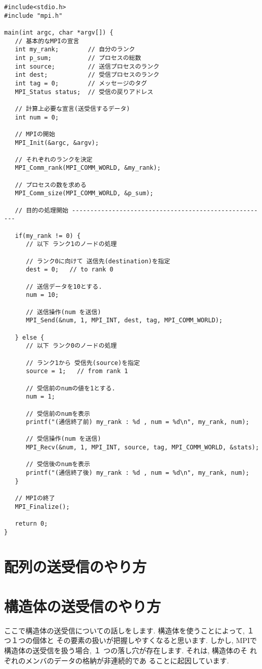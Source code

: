 \documentclass[a4paper,titlepage]{jreport}
\begin{document}
\begin{verbatim}
#include<stdio.h>
#include "mpi.h"

main(int argc, char *argv[]) {
   // 基本的なMPIの宣言
   int my_rank;        // 自分のランク
   int p_sum;          // プロセスの総数
   int source;         // 送信プロセスのランク
   int dest;           // 受信プロセスのランク
   int tag = 0;        // メッセージのタグ
   MPI_Status status;  // 受信の戻りアドレス

   // 計算上必要な宣言(送受信するデータ)
   int num = 0;

   // MPIの開始
   MPI_Init(&argc, &argv);

   // それぞれのランクを決定
   MPI_Comm_rank(MPI_COMM_WORLD, &my_rank);

   // プロセスの数を求める
   MPI_Comm_size(MPI_COMM_WORLD, &p_sum);

   // 目的の処理開始 ------------------------------------------------------

   if(my_rank != 0) {
      // 以下 ランク1のノードの処理

      // ランク0に向けて 送信先(destination)を指定
      dest = 0;   // to rank 0

      // 送信データを10とする.
      num = 10;

      // 送信操作(num を送信)
      MPI_Send(&num, 1, MPI_INT, dest, tag, MPI_COMM_WORLD);

   } else {
      // 以下 ランク0のノードの処理
 
      // ランク1から 受信先(source)を指定
      source = 1;   // from rank 1

      // 受信前のnumの値を1とする.
      num = 1;

      // 受信前のnumを表示
      printf("(通信終了前) my_rank : %d , num = %d\n", my_rank, num);

      // 受信操作(num を送信)
      MPI_Recv(&num, 1, MPI_INT, source, tag, MPI_COMM_WORLD, &stats);

      // 受信後のnumを表示
      printf("(通信終了後) my_rank : %d , num = %d\n", my_rank, num);
   }

   // MPIの終了
   MPI_Finalize();

   return 0;
}
\end{verbatim}

\section{配列の送受信のやり方}

\section{構造体の送受信のやり方}
ここで構造体の送受信についての話しをします.
構造体を使うことによって, １つ１つの個体と
その要素の扱いが把握しやすくなると思います.
しかし, MPIで構造体の送受信を扱う場合, １
つの落し穴が存在します. それは, 構造体のそ
れぞれのメンバのデータの格納が非連続的であ
ることに起因しています.
\end{document}
